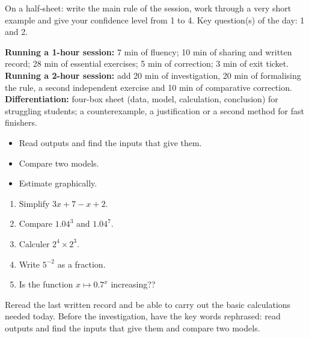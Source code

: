 \begin{sortie}On a half-sheet: write the main rule of the session, work through a very short example and give your confidence level from 1 to 4. Key question(s) of the day: 1 and 2.\end{sortie}

\ifprof
\begin{methode}
\textbf{Running a 1-hour session:} 7 min of fluency; 10 min of sharing and written record; 28 min of essential exercises; 5 min of correction; 3 min of exit ticket.\\
\textbf{Running a 2-hour session:} add 20 min of investigation, 20 min of formalising the rule, a second independent exercise and 10 min of comparative correction.\\
\textbf{Differentiation:} four-box sheet (data, model, calculation, conclusion) for struggling students; a counterexample, a justification or a second method for fast finishers.
\end{methode}
\fi
{}
\begin{objectifs}\begin{itemize}\item Read outputs and find the inputs that give them.\item Compare two models.\item Estimate graphically.\end{itemize}\end{objectifs}
\begin{automatismes}\begin{enumerate}\item Simplify $3x+7-x+2$. \item Compare $1.04^3$ and $1.04^7$. \item Calculer $2^4\times2^3$. \item Write $5^{-2}$ as a fraction. \item Is the function $x\mapsto0.7^x$ increasing?? \end{enumerate}\end{automatismes}
\begin{prerequis}Reread the last written record and be able to carry out the basic calculations needed today. Before the investigation, have the key words rephrased: read outputs and find the inputs that give them and compare two models.\end{prerequis}

